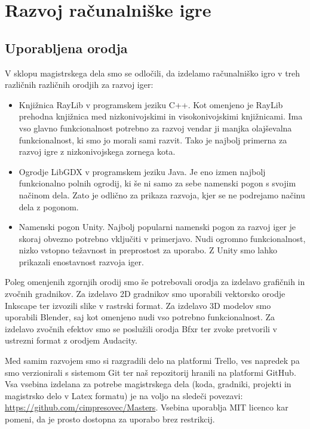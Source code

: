\documentclass[12pt,a4paper,twoside]{book}
\begin{document}
\chapter{Razvoj računalniške igre}\thispagestyle{fancy}
\label{chapter:razvojIger}
\section{Uporabljena orodja}
V sklopu magistrskega dela smo se odločili, da izdelamo računalniško igro v treh različnih različnih orodjih za razvoj iger:
\begin{itemize}
	\item Knjižnica RayLib v programskem jeziku C++. Kot omenjeno je RayLib prehodna knjižnica med nizkonivojskimi in visokonivojskimi knjižnicami. Ima vso glavno funkcionalnost potrebno za razvoj vendar ji manjka olajševalna funkcionalnost, ki smo jo morali sami razvit. Tako je najbolj primerna za razvoj igre z nizkonivojskega zornega kota.
	\item Ogrodje LibGDX v programskem jeziku Java. Je eno izmen najbolj funkcionalno polnih ogrodij, ki še ni samo za sebe namenski pogon s svojim načinom dela. Zato je odlično za prikaza razvoja, kjer se ne podrejamo načinu dela z pogonom.
	\item Namenski pogon Unity. Najbolj popularni namenski pogon za razvoj iger je skoraj obvezno potrebno vključiti v primerjavo. Nudi ogromno funkcionalnost, nizko vstopno težavnost in preprostost za uporabo. Z Unity smo lahko prikazali enostavnost razvoja iger.
\end{itemize}

Poleg omenjenih zgornjih orodij smo še potrebovali orodja za izdelavo grafičnih in zvočnih gradnikov. Za izdelavo 2D gradnikov smo uporabili vektorsko orodje Inkscape ter izvozili slike v rastrski format. Za izdelavo 3D modelov smo uporabili Blender, saj kot omenjeno nudi vso potrebno funkcionalnost. Za izdelavo zvočnih efektov smo se poslužili orodja Bfxr ter zvoke pretvorili v ustrezni format z orodjem Audacity.

Med samim razvojem smo si razgradili delo na platformi Trello, ves napredek pa smo verzionirali s sistemom Git ter naš repozitorij hranili na platformi GitHub. Vsa vsebina izdelana za potrebe magistrskega dela (koda, gradniki, projekti in magistrsko delo v Latex formatu) je na voljo na sledeči povezavi: \url{https://github.com/cimpresovec/Masters}. Vsebina uporablja MIT licenco kar pomeni, da je prosto dostopna za uporabo brez restrikcij.
\end{document}
